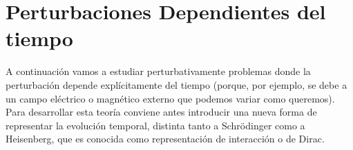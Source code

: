 \documentclass[10pt, a4paper]{article}
\numberwithin{equation}{subsection}
\begin{document}

\pagebreak

\section{Perturbaciones Dependientes del tiempo}
A continuación vamos a estudiar perturbativamente problemas donde la
perturbación depende explícitamente del tiempo (porque, por ejemplo, se debe a
un campo eléctrico o magnético externo que podemos variar como queremos). Para
desarrollar esta teoría conviene antes introducir una nueva forma de
representar la evolución temporal, distinta tanto a Schrödinger como a
Heisenberg, que es conocida como representación de interacción o de Dirac.

\end{document}

